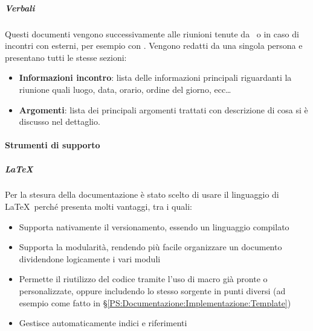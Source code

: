 


			\subparagraph{Verbali}
			Questi documenti vengono successivamente alle riunioni tenute da \gruppo\ o in caso di incontri con  esterni, per esempio con \II. Vengono redatti da una singola persona e presentano tutti le stesse sezioni:
			\begin{itemize}
				\item \textbf{Informazioni incontro}: lista delle informazioni principali riguardanti la riunione quali luogo, data, orario, ordine del giorno, ecc\dots
				\item \textbf{Argomenti}: lista dei principali argomenti trattati con descrizione di cosa si è discusso nel dettaglio.
			\end{itemize}


			\paragraph{Strumenti di supporto}

			\subparagraph{\LaTeX} \label{LaTeX}
			Per la stesura della documentazione è stato scelto di usare il linguaggio di  \LaTeX \ perché presenta molti vantaggi, tra i quali:
			\begin{itemize}
				\item Supporta nativamente il versionamento, essendo un linguaggio compilato
				\item Supporta la modularità, rendendo più facile organizzare un documento dividendone logicamente i vari moduli
				\item Permette il riutilizzo del codice tramite l'uso di macro già pronte o personalizzate, oppure includendo lo stesso sorgente in punti diversi
					(ad esempio come fatto in \S\ref{PS:Documentazione:Implementazione:Template})
				\item Gestisce automaticamente indici e riferimenti
			\end{itemize}

